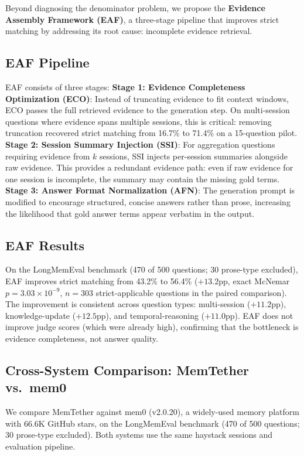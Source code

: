 \documentclass[10pt]{article}
\begin{document}
Beyond diagnosing the denominator problem, we propose the \textbf{Evidence Assembly Framework (EAF)}, a three-stage pipeline that improves strict matching by addressing its root cause: incomplete evidence retrieval.

\subsection{EAF Pipeline}
EAF consists of three stages:
\textbf{Stage 1: Evidence Completeness Optimization (ECO)}: Instead of truncating evidence to fit context windows, ECO passes the full retrieved evidence to the generation step. On multi-session questions where evidence spans multiple sessions, this is critical: removing truncation recovered strict matching from 16.7\% to 71.4\% on a 15-question pilot.
\textbf{Stage 2: Session Summary Injection (SSI)}: For aggregation questions requiring evidence from $k$ sessions, SSI injects per-session summaries alongside raw evidence. This provides a redundant evidence path: even if raw evidence for one session is incomplete, the summary may contain the missing gold terms.
\textbf{Stage 3: Answer Format Normalization (AFN)}: The generation prompt is modified to encourage structured, concise answers rather than prose, increasing the likelihood that gold answer terms appear verbatim in the output.

\subsection{EAF Results}
On the LongMemEval benchmark (470 of 500 questions; 30 prose-type excluded), EAF improves strict matching from 43.2\% to 56.4\% ($+13.2$pp, exact McNemar $p = 3.03 \times 10^{-9}$, $n = 303$ strict-applicable questions in the paired comparison). The improvement is consistent across question types: multi-session ($+11.2$pp), knowledge-update ($+12.5$pp), and temporal-reasoning ($+11.0$pp). EAF does not improve judge scores (which were already high), confirming that the bottleneck is evidence completeness, not answer quality.


\subsection{Cross-System Comparison: MemTether vs.\ mem0}

We compare MemTether against mem0 (v2.0.20), a widely-used memory platform with 66.6K GitHub stars, on the LongMemEval benchmark (470 of 500 questions; 30 prose-type excluded). Both systems use the same haystack sessions and evaluation pipeline.
\end{document}
